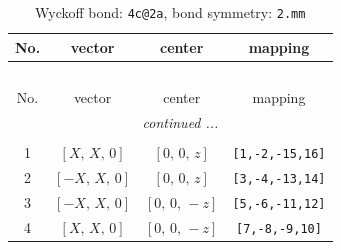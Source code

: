 \documentclass[fleqn,8pt]{jsarticle}
\begin{document}
\renewcommand{\arraystretch}{1.2}
\begin{longtable}{cccc}
\caption{Wyckoff bond: {\tt 4c@2a}, bond symmetry: {\tt 2.mm}}
 \\
 \hline \hline
No. & vector & center & mapping \\ \hline \endfirsthead

\multicolumn{3}{l}{\tablename\ \thetable{}} \\
 \hline \hline
No. & vector & center & mapping \\ \hline \endhead

 \hline \hline
\multicolumn{3}{r}{\footnotesize\it continued ...} \\ \endfoot

 \hline \hline
\multicolumn{3}{r}{} \\ \endlastfoot

1 & $\left[ X,\, X,\, 0 \right]$ & $\left[ 0,\, 0,\, z \right]$ & {\tt [1,-2,-15,16]} \\ \hline
2 & $\left[ - X,\, X,\, 0 \right]$ & $\left[ 0,\, 0,\, z \right]$ & {\tt [3,-4,-13,14]} \\ \hline
3 & $\left[ - X,\, X,\, 0 \right]$ & $\left[ 0,\, 0,\, - z \right]$ & {\tt [5,-6,-11,12]} \\ \hline
4 & $\left[ X,\, X,\, 0 \right]$ & $\left[ 0,\, 0,\, - z \right]$ & {\tt [7,-8,-9,10]} \\
\end{longtable}
\renewcommand{\arraystretch}{1.2}
\end{document}
